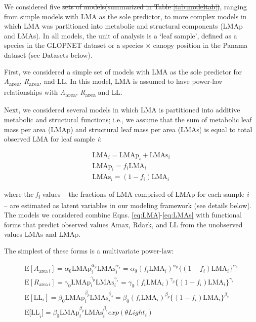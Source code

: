 \documentclass[
  12pt,
  a4paper,
,tablecaptionabove
]{scrartcl}
\providecommand{\DIFaddtex}[1]{{\protect\color{blue}\uwave{#1}}} %
\providecommand{\DIFdeltex}[1]{{\protect\color{red}\sout{#1}}}                      %
\providecommand{\DIFaddbegin}{} %
\providecommand{\DIFaddend}{} %
\providecommand{\DIFdelbegin}{} %
\providecommand{\DIFdelend}{} %
\providecommand{\DIFadd}[1]{\texorpdfstring{\DIFaddtex{#1}}{#1}} %
\providecommand{\DIFdel}[1]{\texorpdfstring{\DIFdeltex{#1}}{}} %
\newcommand{\DIFscaledelfig}{0.5}
\newlength{\DIFdelgraphicswidth} %
\newlength{\DIFdelgraphicsheight} %
\newcommand{\DIFaddincludegraphics}[2][]{{\color{blue}\fbox{\DIFOincludegraphics[#1]{#2}}}} %
\newcommand{\DIFdelincludegraphics}[2][]{%
\sbox{\DIFdelgraphicsbox}{\DIFOincludegraphics[#1]{#2}}%
\settoboxwidth{\DIFdelgraphicswidth}{\DIFdelgraphicsbox} %
\settoboxtotalheight{\DIFdelgraphicsheight}{\DIFdelgraphicsbox} %
\scalebox{\DIFscaledelfig}{%
\parbox[b]{\DIFdelgraphicswidth}{\usebox{\DIFdelgraphicsbox}\\[-\baselineskip] \rule{\DIFdelgraphicswidth}{0em}}\llap{\resizebox{\DIFdelgraphicswidth}{\DIFdelgraphicsheight}{%
\setlength{\unitlength}{\DIFdelgraphicswidth}%
\begin{picture}(1,1)%
\thicklines\linethickness{2pt} %
{\color[rgb]{1,0,0}\put(0,0){\framebox(1,1){}}}%
{\color[rgb]{1,0,0}\put(0,0){\line( 1,1){1}}}%
{\color[rgb]{1,0,0}\put(0,1){\line(1,-1){1}}}%
\end{picture}%
}\hspace*{3pt}}} %
} %
\DeclareRobustCommand{\DIFaddbegin}{\DIFOaddbegin \let\includegraphics\DIFaddincludegraphics} %
\DeclareRobustCommand{\DIFaddend}{\DIFOaddend \let\includegraphics\DIFOincludegraphics} %
\DeclareRobustCommand{\DIFdelbegin}{\DIFOdelbegin \let\includegraphics\DIFdelincludegraphics} %
\DeclareRobustCommand{\DIFdelend}{\DIFOaddend \let\includegraphics\DIFOincludegraphics} %
\begin{document}
We considered five \DIFdelbegin \DIFdel{sets of models(summarized in Table \ref{tab:modeltab})}\DIFdelend \DIFaddbegin \DIFadd{types of models}\DIFaddend , ranging from simple models with LMA as the sole predictor, to more complex models in which LMA was partitioned into metabolic and structural components (LMAp and LMAs).
In all models, the unit of analysis is a `leaf sample', defined as a species in the GLOPNET dataset or a species \(\times\) canopy position in the Panama dataset (see Datasets below).

First, we considered a simple set of models with LMA as the sole predictor for \emph{A}\textsubscript{area}, \emph{R}\textsubscript{area}, and LL.
In this model, LMA is assumed to have power-law relationships with \emph{A}\textsubscript{area}, \emph{R}\textsubscript{area} and LL.

Next, we considered several models in which LMA is partitioned into additive metabolic and structural functions; i.e., we assume that the sum of metabolic leaf mass per area (LMAp) and structural leaf mass per area (LMAs) is equal to total observed LMA for leaf sample \emph{i}:

\begin{align}
  &\mathrm{LMA}_{i} =\mathrm{LMAp}_{i} + \mathrm{LMAs}_{i} \label{eq:LMA}\\
  &\mathrm{LMAp}_{i} = f_{i} \mathrm{LMA}_{i} \label{eq:LMAp}\\
  &\mathrm{LMAs}_{i} = (1 - f_{i})  \mathrm{LMA}_{i}\label{eq:LMAs}
\end{align}

where the \emph{f\textsubscript{i}} values -- the fractions of LMA comprised of LMAp for each sample \emph{i} -- are estimated as latent variables in our modeling framework (see details below).
The models we considered combine Eqns. \eqref{eq:LMA}-\eqref{eq:LMAs} with functional forms that predict observed values Amax, Rdark, and LL from the unobserved values LMAs and LMAp.

The simplest of these forms is a multivariate power-law:

\begin{align}
& \mathrm{E}[A_{\mathrm{area} \, i}]
= \alpha_0\mathrm{LMAp}_{i}^{\alpha_p}\mathrm{LMAs}_i^{\alpha_s}  =  \alpha_0 (f_i \mathrm{LMA}_{i})^{\alpha_p} \bigl\{(1-f_i) \mathrm{LMA}_{i}\bigr\}^{\alpha_s} \label{eq:E-A} \\
& \mathrm{E}[R_{\mathrm{area} \, i}]
= \gamma_0\mathrm{LMAp}_{i}^{\gamma_p} \mathrm{LMAs}_{i}^{\gamma_s}
= \gamma_0 (f_i \mathrm{LMA}_{i})^{\gamma_p} \bigl\{(1-f_i)\mathrm{LMA}_{i}\bigr\}^{\gamma_s} \label{eq:E-R} \\
& \mathrm{E}[\mathrm{LL}_i] = \beta_0\mathrm{LMAp}_{i}^{\beta_p} \mathrm{LMAs}_{i}^{\beta_s}   = \beta_0 (f_i \mathrm{LMA}_{i})^{\beta_p} \bigl\{(1-f_i) \mathrm{LMA}_{i}\bigr\}^{\beta_s} \tag{6a}  \\
& \mathrm{E[LL}_i] = \beta_0\mathrm{LMAp}_{i}^{\beta_p} \mathrm{LMAs}_{i}^{\beta_s} exp(\theta Light_i) \tag{6b}
\end{align}
\end{document}
